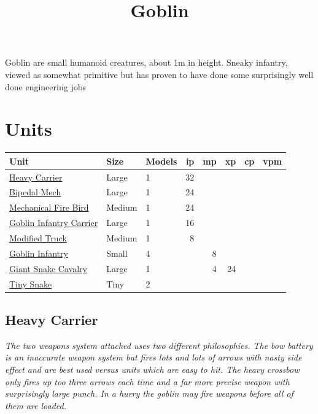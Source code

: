 \documentclass[a4paper,12pt]{article}
\title{Goblin}
\author{}
\date{}
\begin{document}
\maketitle

Goblin are small humanoid creatures, about 1m in height. Sneaky infantry, viewed as somewhat primitive but has proven to have done some surprisingly well done engineering jobs

\setcounter{tocdepth}{1}
\tableofcontents
\newpage

\section{Units}
\label{section-units}

\begin{longtable}{@{}p{}llrrrrr@{}}
\textbf{Unit} & \textbf{Size} & \textbf{Models} & \textbf{ip} & \textbf{mp} & \textbf{xp} & \textbf{cp} & \textbf{vpm} \\
\hline
\endhead
\hyperref[unit-heavy-carrier]{Heavy Carrier} & Large & 1 & 32 &  &  &  &  \\
\hyperref[unit-bipedal-mech]{Bipedal Mech} & Large & 1 & 24 &  &  &  &  \\
\hyperref[unit-mechanical-fire-bird]{Mechanical Fire Bird} & Medium & 1 & 24 &  &  &  &  \\
\hyperref[unit-goblin-infantry-carrier]{Goblin Infantry Carrier} & Large & 1 & 16 &  &  &  &  \\
\hyperref[unit-modified-truck]{Modified Truck} & Medium & 1 & 8 &  &  &  &  \\
\hyperref[unit-goblin-infantry]{Goblin Infantry} & Small & 4 &  & 8 &  &  &  \\
\hyperref[unit-giant-snake-cavalry]{Giant Snake Cavalry} & Large & 1 &  & 4 & 24 &  &  \\
\hyperref[unit-tiny-snake]{Tiny Snake} & Tiny & 2 &  &  &  &  &  \\
\end{longtable}

\subsection{Heavy Carrier}
\label{unit-heavy-carrier}

\textit{The two weapons system attached uses two different philosophies. The bow battery is an inaccurate weapon system but fires lots and lots of arrows with nasty side effect and are best used versus units which are easy to hit. The heavy crossbow only fires up too three arrows each time and a far more precise weapon with surprisingly large punch. In a hurry the goblin may fire weapons before all of them are loaded.}
\end{document}
